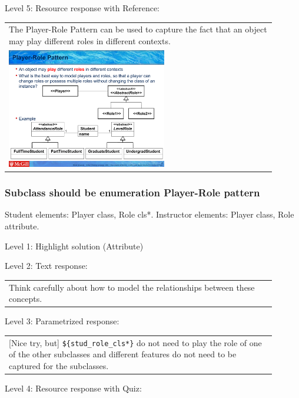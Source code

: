 \noindent Level 5: Resource response with Reference: \medskip

\begin{tabular}{|p{0.9\linewidth}}
The Player-Role Pattern can be used to capture the fact that an object may play different roles
in different contexts.

\\
\includegraphics[width=0.6\textwidth]{images/player_role.png}
\end{tabular} \medskip


\subsubsection{Subclass should be enumeration Player-Role pattern}

Student elements: Player class, Role cls*. Instructor elements: Player class, Role attribute. \medskip

\noindent Level 1: Highlight solution (Attribute) \medskip

\noindent Level 2: Text response: \medskip

\begin{tabular}{|p{0.9\linewidth}}
Think carefully about how to model the relationships between these concepts.
\end{tabular} \medskip

\noindent Level 3: Parametrized response: \medskip

\begin{tabular}{|p{0.9\linewidth}}
[Nice try, but] \verb|${stud_role_cls*}| do not need to play the role of one of the other subclasses and different features do not need to be captured for the subclasses.
\end{tabular} \medskip

\noindent Level 4: Resource response with Quiz: \medskip



